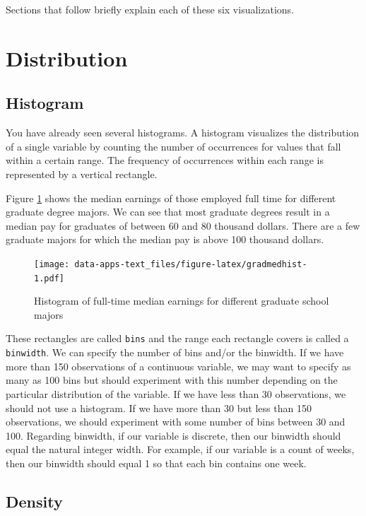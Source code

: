 \documentclass[
]{book}
\begin{document}
Sections that follow briefly explain each of these six visualizations.

\hypertarget{distribution}{%
\section{Distribution}\label{distribution}}

\hypertarget{histogram}{%
\subsection{Histogram}\label{histogram}}

You have already seen several histograms. A histogram visualizes the distribution of a single variable by counting the number of occurrences for values that fall within a certain range. The frequency of occurrences within each range is represented by a vertical rectangle.

Figure \ref{fig:gradmedhist} shows the median earnings of those employed full time for different graduate degree majors. We can see that most graduate degrees result in a median pay for graduates of between 60 and 80 thousand dollars. There are a few graduate majors for which the median pay is above 100 thousand dollars.

\begin{figure}
\centering
\texttt{[image: data-apps-text\_files/figure-latex/gradmedhist-1.pdf]}
\caption{\label{fig:gradmedhist}Histogram of full-time median earnings for different graduate school majors}
\end{figure}

These rectangles are called \texttt{bins} and the range each rectangle covers is called a \texttt{binwidth}. We can specify the number of bins and/or the binwidth. If we have more than 150 observations of a continuous variable, we may want to specify as many as 100 bins but should experiment with this number depending on the particular distribution of the variable. If we have less than 30 observations, we should not use a histogram. If we have more than 30 but less than 150 observations, we should experiment with some number of bins between 30 and 100. Regarding binwidth, if our variable is discrete, then our binwidth should equal the natural integer width. For example, if our variable is a count of weeks, then our binwidth should equal 1 so that each bin contains one week.

\hypertarget{density}{%
\subsection{Density}\label{density}}
\end{document}
